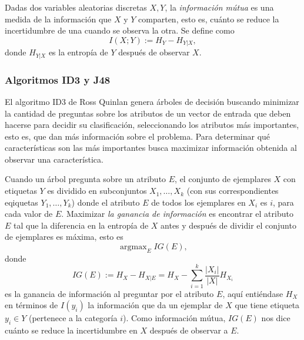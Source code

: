 \documentclass[spanish,11pt,letterpaper]{article}
\begin{document}
Dadas dos variables aleatorias discretas $X,Y$, la \textit{información mútua} es
una medida de la información que $X$ y $Y$ comparten, esto es, cuánto se reduce
la incertidumbre de una cuando se observa la otra. Se define como
\[I(X;Y) := H_Y-H_{Y|X},\]
donde $H_{Y|X}$ es la entropía de $Y$ después de observar $X$.

\subsubsection{Algoritmos ID3 y J48}

El algoritmo ID3 de Ross Quinlan genera árboles de decisión buscando minimizar la
cantidad de preguntas sobre los atributos de un vector de entrada que deben hacerse
para decidir su clasificación, seleccionando los atributos más importantes, esto es,
que dan más información sobre el problema. Para determinar qué características son
las más importantes busca maximizar información obtenida al observar una
característica.

Cuando un árbol pregunta sobre un atributo $E$, el conjunto de ejemplares $X$ con
etiquetas $Y$ es dividido en subconjuntos $X_1,\ldots,X_k$ (con sus correspondientes
eqiquetas $Y_1,\ldots,Y_k$) donde el atributo $E$ de todos los ejemplares en $X_i$
es $i$, para cada valor de $E$. Maximizar
\textit{la ganancia de información} es encontrar el atributo $E$ tal que la diferencia
en la entropía de $X$ antes y después de dividir el conjunto de ejemplares es
máxima, esto es
\[\operatorname{arg max}_E IG(E),\]
donde
\[IG(E) := H_X - H_{X|E} = H_X - \sum_{i=1}^k \frac{|X_i|}{|X|}H_{X_i}\]
es la ganancia de información al preguntar por el atributo $E$, aquí entiéndase
$H_X$ en términos de $I(y_i)$ la información que da un ejemplar de $X$ que tiene
etiqueta $y_i \in Y$ (pertenece a la categoría $i$). Como
información mútua, $IG(E)$ nos dice cuánto se reduce la incertidumbre en $X$ después
de observar a $E$.
\end{document}

